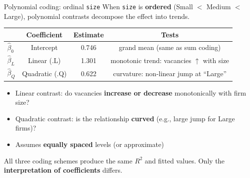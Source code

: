 \documentclass[10pt,ignorenonframetext,aspectratio=169]{beamer}
\begin{document}
\begin{frame}{Polynomial coding: ordinal \texttt{size}}
    When \texttt{size} is \textbf{ordered} (Small $<$ Medium $<$ Large), polynomial contrasts decompose the effect into trends.

    \begin{table}[h]\centering\small
    \begin{tabular}{lccc}
    \hline
    & \textbf{Coefficient} & \textbf{Estimate} & \textbf{Tests} \\
    \hline
    $\hat{\beta}_0$ & Intercept & 0.746 & grand mean (same as sum coding) \\
    $\hat{\beta}_L$ & Linear (.L) & 1.301 & monotonic trend: vacancies $\uparrow$ with size \\
    $\hat{\beta}_Q$ & Quadratic (.Q) & 0.622 & curvature: non-linear jump at ``Large'' \\
    \hline
    \end{tabular}
    \end{table}

    \begin{itemize}
        \item Linear contrast: do vacancies \textbf{increase or decrease} monotonically with firm size?
        \item Quadratic contrast: is the relationship \textbf{curved} (e.g., large jump for Large firms)?
        \item Assumes \textbf{equally spaced} levels (or approximate)
    \end{itemize}

    \medskip
    \alert{All three coding schemes produce the same $R^2$ and fitted values.} Only the \textbf{interpretation of coefficients} differs.
\end{frame}
\end{document}
